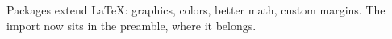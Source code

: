 \documentclass{article}
\begin{document}
Packages extend LaTeX: graphics, colors, better math, custom margins.
The import now sits in the preamble, where it belongs.
\end{document}
